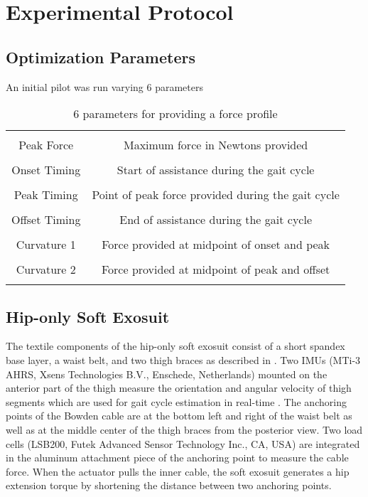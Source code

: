 \section{Experimental Protocol}
\subsection*{Optimization Parameters}
An initial pilot was run varying 6 parameters
\begin{table}[h]
  \centering
  \begin{tabular}{ |c c| }
  \hline
  &\\
  Peak Force & Maximum force in Newtons provided\\
  &\\
  Onset Timing & Start of assistance during the gait cycle\\
  &\\
  Peak Timing & Point of peak force provided during the gait cycle\\
  &\\
  Offset Timing & End of assistance during the gait cycle\\
  &\\
  Curvature 1 & Force provided at midpoint of onset and peak\\
  &\\
  Curvature 2 & Force provided at midpoint of peak and offset\\
  &\\
  \hline
  \end{tabular}
\caption{6 parameters for providing a force profile}
\label{tab:forceparam}
\end{table}

\subsection*{Hip-only Soft Exosuit}
The textile components of the hip-only soft exosuit consist of a short spandex base layer, a waist belt, and two thigh braces as described in \citep{Lee2018}. Two IMUs (MTi-3 AHRS, Xsens Technologies B.V., Enschede, Netherlands) mounted on the anterior part of the thigh measure the orientation and angular velocity of thigh segments which are used for gait cycle estimation in real-time \citep{Ding2016}. The anchoring points of the Bowden cable are at the bottom left and right of the waist belt as well as at the middle center of the thigh braces from the posterior view. Two load cells (LSB200, Futek Advanced Sensor Technology Inc., CA, USA) are integrated in the aluminum attachment piece of the anchoring point to measure the cable force. When the actuator pulls the inner cable, the soft exosuit generates a hip extension torque by shortening the distance between two anchoring points. 

